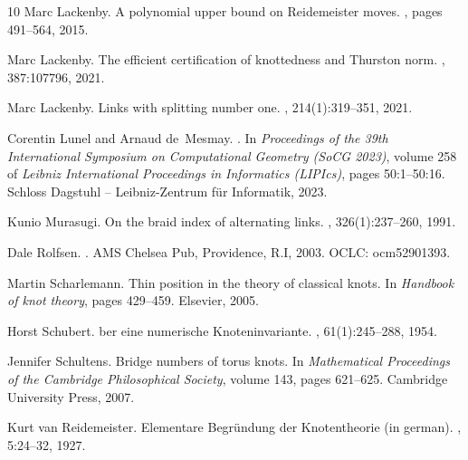 \documentclass[10pt,a4paper]{amsart}
\begin{document}
\begin{thebibliography}{10}
Marc Lackenby.
\newblock A polynomial upper bound on {R}eidemeister moves.
, pages 491--564, 2015.

Marc Lackenby.
\newblock The efficient certification of knottedness and {T}hurston norm.
, 387:107796, 2021.

Marc Lackenby.
\newblock Links with splitting number one.
, 214(1):319--351, 2021.

Corentin Lunel and Arnaud de~Mesmay.
.
\newblock In {\em Proceedings of the 39th International Symposium on
  Computational Geometry (SoCG 2023)}, volume 258 of {\em Leibniz International
  Proceedings in Informatics (LIPIcs)}, pages 50:1--50:16. Schloss Dagstuhl --
  Leibniz-Zentrum f{\"u}r Informatik, 2023.

Kunio Murasugi.
\newblock On the braid index of alternating links.
,
  326(1):237--260, 1991.

Dale Rolfsen.
.
\newblock AMS Chelsea Pub, Providence, R.I, 2003.
\newblock OCLC: ocm52901393.

Martin Scharlemann.
\newblock Thin position in the theory of classical knots.
\newblock In {\em Handbook of knot theory}, pages 429--459. Elsevier, 2005.

Horst Schubert.
ber eine numerische {K}noteninvariante.
, 61(1):245--288, 1954.

Jennifer Schultens.
\newblock Bridge numbers of torus knots.
\newblock In {\em Mathematical Proceedings of the Cambridge Philosophical
  Society}, volume 143, pages 621--625. Cambridge University Press, 2007.

Kurt van Reidemeister.
\newblock Elementare {B}egr{\"u}ndung der {K}notentheorie (in german).
, 5:24--32, 1927.

\end{thebibliography}
\end{document}
